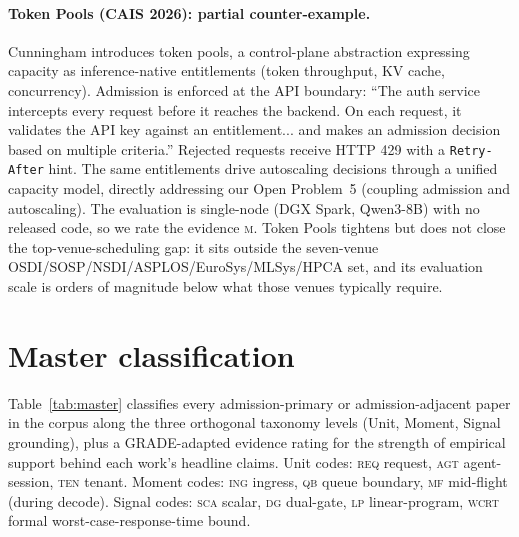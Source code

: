\documentclass[11pt,letterpaper]{article}
\theoremstyle{definition}
\begin{document}
\paragraph{Token Pools (CAIS 2026): partial counter-example.}
Cunningham \cite{cunningham2026tokenpools} introduces token pools, a
control-plane abstraction expressing capacity as inference-native
entitlements (token throughput, KV cache, concurrency). Admission is
enforced at the API boundary: ``The auth service intercepts every
request before it reaches the backend. On each request, it validates
the API key against an entitlement... and makes an admission decision
based on multiple criteria.'' Rejected requests receive HTTP 429 with
a \texttt{Retry-After} hint. The same entitlements drive autoscaling
decisions through a unified capacity model, directly addressing our
Open Problem~5 (coupling admission and autoscaling). The evaluation
is single-node (DGX Spark, Qwen3-8B) with no released code, so we
rate the evidence \textsc{m}. Token Pools tightens but does not close
the top-venue-scheduling gap: it sits outside the seven-venue
OSDI/SOSP/NSDI/ASPLOS/EuroSys/MLSys/HPCA set, and its evaluation
scale is orders of magnitude below what those venues typically
require.

\section{Master classification}
\label{sec:master}

Table~\ref{tab:master} classifies every admission-primary or
admission-adjacent paper in the corpus along the three orthogonal
taxonomy levels (Unit, Moment, Signal grounding), plus a
GRADE-adapted evidence rating for the strength of empirical support
behind each work's headline claims. Unit codes: \textsc{req} request,
\textsc{agt} agent-session, \textsc{ten} tenant. Moment codes:
\textsc{ing} ingress, \textsc{qb} queue boundary, \textsc{mf}
mid-flight (during decode). Signal codes: \textsc{sca} scalar,
\textsc{dg} dual-gate, \textsc{lp} linear-program, \textsc{wcrt}
formal worst-case-response-time bound.
\end{document}
